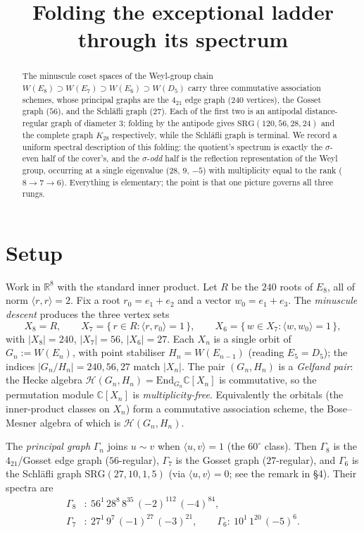 \documentclass[11pt]{article}
\title{Folding the exceptional ladder through its spectrum}
\author{}
\date{}
\theoremstyle{remark}
\newcommand{\RR}{\mathbb{R}}
\newcommand{\CC}{\mathbb{C}}
\newcommand{\Weyl}{W}
\newcommand{\ip}[2]{\langle #1,#2\rangle}
\begin{document}
\maketitle
\vspace{-2.5em}

\begin{abstract}
\noindent
The minuscule coset spaces of the Weyl-group chain
$\Weyl(E_8)\supset \Weyl(E_7)\supset \Weyl(E_6)\supset \Weyl(D_5)$ carry three
commutative association schemes, whose principal graphs are the $4_{21}$ edge
graph ($240$ vertices), the Gosset graph ($56$), and the Schl\"afli graph
($27$). Each of the first two is an antipodal distance-regular graph of
diameter $3$; folding by the antipode gives $\mathrm{SRG}(120,56,28,24)$ and the
complete graph $K_{28}$ respectively, while the Schl\"afli graph is terminal.
We record a uniform spectral description of this folding: the quotient's
spectrum is exactly the $\sigma$-even half of the cover's, and the
$\sigma$-\emph{odd} half is the reflection representation of the Weyl group,
occurring at a single eigenvalue ($28$, $9$, $-5$) with multiplicity equal to
the rank ($8\to7\to6$). Everything is elementary; the point is that one picture
governs all three rungs.
\end{abstract}

\section{Setup}

Work in $\RR^8$ with the standard inner product. Let $R$ be the $240$ roots of
$E_8$, all of norm $\ip{r}{r}=2$. Fix a root $r_0=e_1+e_2$ and a vector
$w_0=e_1+e_3$. The \emph{minuscule descent} produces the three vertex sets
\[
  X_8=R,\qquad
  X_7=\{\,r\in R:\ip{r}{r_0}=1\,\},\qquad
  X_6=\{\,w\in X_7:\ip{w}{w_0}=1\,\},
\]
with $|X_8|=240$, $|X_7|=56$, $|X_6|=27$.
Each $X_n$ is a single orbit of $G_n:=\Weyl(E_n)$, with point stabiliser
$H_n=\Weyl(E_{n-1})$ (reading $E_5=D_5$); the indices
$|G_n/H_n|=240,56,27$ match $|X_n|$. The pair $(G_n,H_n)$ is a
\emph{Gelfand pair}: the Hecke algebra
$\mathcal H(G_n,H_n)=\mathrm{End}_{G_n}\CC[X_n]$ is commutative, so the
permutation module $\CC[X_n]$ is \emph{multiplicity-free}. Equivalently the
orbitals (the inner-product classes on $X_n$) form a commutative association
scheme, the Bose--Mesner algebra of which is $\mathcal H(G_n,H_n)$.

The \emph{principal graph} $\Gamma_n$ joins $u\sim v$ when $\ip{u}{v}=1$ (the
$60^\circ$ class). Then $\Gamma_8$ is the $4_{21}$/Gosset edge graph
($56$-regular), $\Gamma_7$ is the Gosset graph ($27$-regular), and $\Gamma_6$ is
the Schl\"afli graph $\mathrm{SRG}(27,10,1,5)$ (via $\ip{u}{v}=0$; see the
remark in \S4). Their spectra are
\[
  \begin{aligned}
  \Gamma_8&:\ 56^1\,28^8\,8^{35}\,(-2)^{112}\,(-4)^{84},\\
  \Gamma_7&:\ 27^1\,9^7\,(-1)^{27}\,(-3)^{21},
  \qquad
  \Gamma_6:\ 10^1\,1^{20}\,(-5)^6 .
  \end{aligned}
\]
\end{document}
